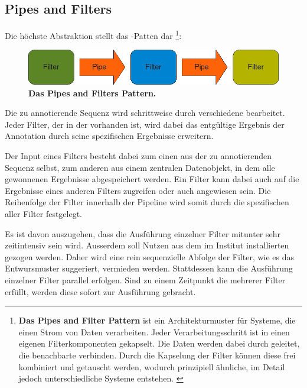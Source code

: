 \subsection{Pipes and Filters} \label{chp:pipes and filters}
Die höchste Abstraktion stellt das -Patten dar
\footnote{
\textbf{Das Pipes and Filter Pattern}
	ist ein Architekturmuster für Systeme, die einen Strom von Daten verarbeiten.
	Jeder Verarbeitungsschritt ist in einen eigenen Filterkomponenten gekapselt.
	Die Daten werden dabei durch  geleitet, die benachbarte
	 verbinden.
	Durch die Kapselung der Filter können diese frei kombiniert und
	getauscht werden, wodurch prinzipiell ähnliche, im Detail jedoch
	unterschiedliche Systeme entstehen.
	\citep{buschmann_pattern-oriented_1996}
}:

\begin{figure}[htbp]
	\begin{center}
		\includegraphics[scale=0.7]{pics/pipesFilter3.png}
	\caption[Pipes and Filter Pattern]{
	\textbf{Das Pipes and Filters Pattern.}
	}
	\end{center}
	\label{fig:pipesFilter}
\end{figure}

Die zu annotierende Sequenz wird schrittweise durch verschiedene 
bearbeitet. Jeder Filter, der in der  vorhanden ist, wird dabei
das entgültige Ergebnis der Annotation durch seine spezifischen Ergebnisse
erweitern.

Der Input eines Filters besteht dabei zum einen aus der zu
annotierenden Sequenz selbst, zum anderen aus einem zentralen Datenobjekt, in
dem alle gewonnenen Ergebnisse abgespeichert werden.
Ein Filter kann dabei auch auf die Ergebnisse eines anderen
Filters zugreifen oder auch angewiesen sein.
Die Reihenfolge der Filter innerhalb der Pipeline wird
somit durch die spezifischen  \citep{beck_patterns_1994}
aller Filter festgelegt.

Es ist davon auszugehen, dass die Ausführung einzelner Filter mitunter sehr
zeitintensiv sein wird. Ausserdem soll Nutzen aus dem im Institut installierten
  gezogen werden. Daher wird eine rein
sequenzielle Abfolge der Filter, wie es das Entwursmuster suggeriert, vermieden werden.
Stattdessen kann die Ausführung einzelner Filter parallel erfolgen.
Sind zu einem Zeitpunkt die  mehrerer Filter erfüllt,
werden diese sofort zur Ausführung gebracht.

